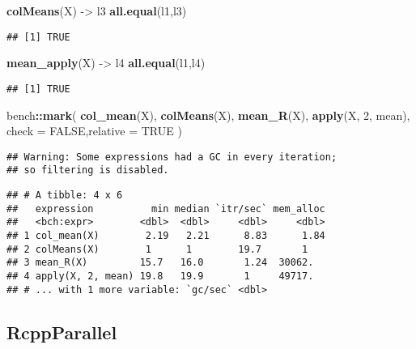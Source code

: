 \documentclass[]{ctexbook}
\newenvironment{Shaded}{\begin{snugshade}}{\end{snugshade}}
\newcommand{\DataTypeTok}[1]{\textcolor[rgb]{0.13,0.29,0.53}{#1}}
\newcommand{\DecValTok}[1]{\textcolor[rgb]{0.00,0.00,0.81}{#1}}
\newcommand{\KeywordTok}[1]{\textcolor[rgb]{0.13,0.29,0.53}{\textbf{#1}}}
\newcommand{\NormalTok}[1]{#1}
\newcommand{\OperatorTok}[1]{\textcolor[rgb]{0.81,0.36,0.00}{\textbf{#1}}}
\newcommand{\OtherTok}[1]{\textcolor[rgb]{0.56,0.35,0.01}{#1}}
\newcommand{\StringTok}[1]{\textcolor[rgb]{0.31,0.60,0.02}{#1}}
\begin{document}
\begin{Shaded}
\begin{Highlighting}[]
\KeywordTok{colMeans}\NormalTok{(X) ->}\StringTok{ }\NormalTok{l3}
\KeywordTok{all.equal}\NormalTok{(l1,l3)}
\end{Highlighting}
\end{Shaded}

\begin{verbatim}
## [1] TRUE
\end{verbatim}

\begin{Shaded}
\begin{Highlighting}[]
\KeywordTok{mean_apply}\NormalTok{(X) ->}\StringTok{ }\NormalTok{l4}
\KeywordTok{all.equal}\NormalTok{(l1,l4)}
\end{Highlighting}
\end{Shaded}

\begin{verbatim}
## [1] TRUE
\end{verbatim}

\begin{Shaded}
\begin{Highlighting}[]
\NormalTok{bench}\OperatorTok{::}\KeywordTok{mark}\NormalTok{(}
  \KeywordTok{col_mean}\NormalTok{(X),}
  \KeywordTok{colMeans}\NormalTok{(X),}
  \KeywordTok{mean_R}\NormalTok{(X),}
  \KeywordTok{apply}\NormalTok{(X, }\DecValTok{2}\NormalTok{, mean),}
  \DataTypeTok{check =} \OtherTok{FALSE}\NormalTok{,}\DataTypeTok{relative =} \OtherTok{TRUE}
\NormalTok{)}
\end{Highlighting}
\end{Shaded}

\begin{verbatim}
## Warning: Some expressions had a GC in every iteration;
## so filtering is disabled.
\end{verbatim}

\begin{verbatim}
## # A tibble: 4 x 6
##   expression          min median `itr/sec` mem_alloc
##   <bch:expr>        <dbl>  <dbl>     <dbl>     <dbl>
## 1 col_mean(X)        2.19   2.21      8.83      1.84
## 2 colMeans(X)        1      1        19.7       1   
## 3 mean_R(X)         15.7   16.0       1.24  30062.  
## 4 apply(X, 2, mean) 19.8   19.9       1     49717.  
## # ... with 1 more variable: `gc/sec` <dbl>
\end{verbatim}

\hypertarget{rcppparallel}{%
\subsection{RcppParallel}\label{rcppparallel}}
\end{document}
